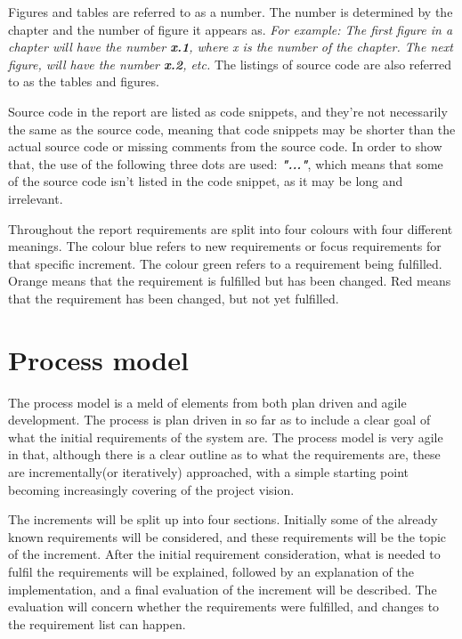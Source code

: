 Figures and tables are referred to as a number. The number is determined by the chapter and the number of figure it appears as. \newline
\textit{For example: The first figure in a chapter will have the number \textbf{x.1}, where x is the number of the chapter. The next figure, will have the number \textbf{x.2}, etc.}
\newline
The listings of source code are also referred to as the tables and figures. 

Source code in the report are listed as code snippets, and they're not necessarily the same as the source code, meaning that code snippets may be shorter than the actual source code or missing comments from the source code. In order to show that, the use of the following three dots are used: \textit\textbf{{"..."}}, which means that some of the source code isn't listed in the code snippet, as it may be long and irrelevant. 

Throughout the report requirements are split into four colours with four different meanings. The colour blue refers to new requirements or focus requirements for that specific increment. The colour green refers to a requirement being fulfilled. Orange means that the requirement is fulfilled but has been changed. Red means that the requirement has been changed, but not yet fulfilled. 

\chapter*{Process model}
The process model is a meld of elements from both plan driven and agile development. The process is plan driven in so far as to include a clear goal of what the initial requirements of the system are. The process model is very agile in that, although there is a clear outline as to what the requirements are, these are incrementally(or iteratively) approached, with a simple starting point becoming increasingly covering of the project vision.

The increments will be split up into four sections. Initially some of the already known requirements will be considered, and these requirements will be the topic of the increment.
After the initial requirement consideration, what is needed to fulfil the requirements will be explained, followed by an explanation of the implementation, and a final evaluation of the increment will be described. The evaluation will concern whether the requirements were fulfilled, and changes to the requirement list can happen.

